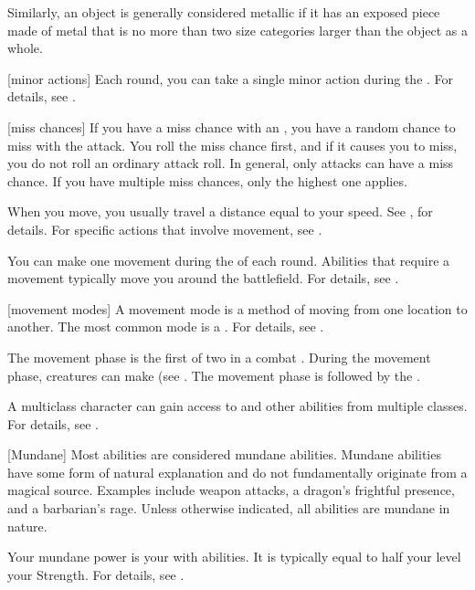 Similarly, an object is generally considered metallic if it has an exposed piece made of metal that is no more than two size categories larger than the object as a whole.

[minor actions] Each round, you can take a single minor action during the .
For details, see .

[miss chances] If you have a miss chance with an , you have a random chance to miss with the attack.
You roll the miss chance first, and if it causes you to miss, you do not roll an ordinary attack roll.
In general, only  attacks can have a miss chance.
If you have multiple miss chances, only the highest one applies.

 When you move, you usually travel a distance equal to your speed.
See , for details.
For specific actions that involve movement, see .

 You can make one movement during the  of each round.
Abilities that require a movement typically move you around the battlefield.
For details, see .

[movement modes] A movement mode is a method of moving from one location to another.
The most common mode is a .
For details, see .

 The movement phase is the first of two  in a combat .
During the movement phase, creatures can make  (see .
The movement phase is followed by the .

 A multiclass character can gain access to  and other abilities from multiple classes.
For details, see .

[Mundane] Most abilities are considered mundane abilities.
Mundane abilities have some form of natural explanation and do not fundamentally originate from a magical source.
Examples include weapon attacks, a dragon's frightful presence, and a barbarian's rage.
Unless otherwise indicated, all abilities are mundane in nature.

 Your mundane power is your  with  abilities.
It is typically equal to half your level \add your Strength.
For details, see .

